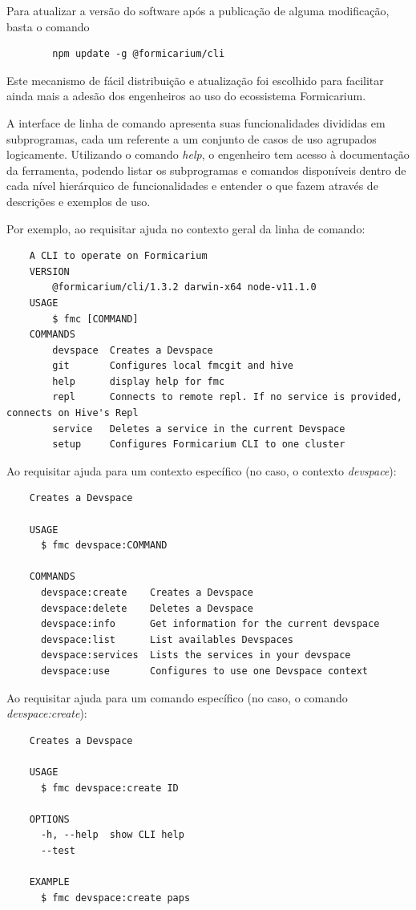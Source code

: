 	Para atualizar a versão do software após a publicação de alguma modificação, basta o comando
	\begin{verbatim}
	    npm update -g @formicarium/cli
	\end{verbatim}
	
	Este mecanismo de fácil distribuição e atualização foi escolhido para facilitar ainda mais a adesão dos engenheiros ao uso do ecossistema Formicarium.

    A interface de linha de comando apresenta suas funcionalidades divididas em subprogramas, cada um referente a um conjunto de casos de uso agrupados logicamente. Utilizando o comando \textit{help}, o engenheiro tem acesso à documentação da ferramenta, podendo listar os subprogramas e comandos disponíveis dentro de cada nível hierárquico de funcionalidades e entender o que fazem através de descrições e exemplos de uso.

    Por exemplo, ao requisitar ajuda no contexto geral da linha de comando:

    \begin{verbatim}
    A CLI to operate on Formicarium
    VERSION
        @formicarium/cli/1.3.2 darwin-x64 node-v11.1.0
    USAGE
        $ fmc [COMMAND]
    COMMANDS
        devspace  Creates a Devspace
        git       Configures local fmcgit and hive
        help      display help for fmc
        repl      Connects to remote repl. If no service is provided, connects on Hive's Repl
        service   Deletes a service in the current Devspace
        setup     Configures Formicarium CLI to one cluster
    \end{verbatim}
    
    Ao requisitar ajuda para um contexto específico (no caso, o contexto \textit{devspace}):
    \begin{verbatim}
    Creates a Devspace
    
    USAGE
      $ fmc devspace:COMMAND
    
    COMMANDS
      devspace:create    Creates a Devspace
      devspace:delete    Deletes a Devspace
      devspace:info      Get information for the current devspace
      devspace:list      List availables Devspaces
      devspace:services  Lists the services in your devspace
      devspace:use       Configures to use one Devspace context
    \end{verbatim}
    
    
    Ao requisitar ajuda para um comando específico (no caso, o comando \textit{devspace:create}):
    \begin{verbatim}
    Creates a Devspace
    
    USAGE
      $ fmc devspace:create ID
    
    OPTIONS
      -h, --help  show CLI help
      --test
    
    EXAMPLE
      $ fmc devspace:create paps
    \end{verbatim}


